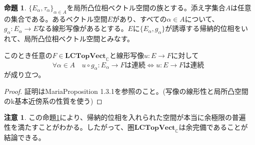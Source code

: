 ﻿\documentclass[12pt]{jsarticle}
\newcommand{\C}{\mathbb{C}}
\newcommand{\LCTopVect}{\textbf{LCTopVect}_{\C}}
\theoremstyle{definition}%
\newtheorem{proposition}[definition]{命題}
\newtheorem{remark}[definition]{注意}
\begin{document}
\begin{proposition}\label{universality}
  $\{ E_{\alpha} , \tau_{\alpha} \}_{\alpha \in A}$を局所凸位相ベクトル空間の族とする。添え字集合$A$は任意の集合である。あるベクトル空間$E$があり、すべての$\alpha \in A$について、$g_{\alpha} \colon E_{\alpha} \to E$なる線形写像があるとする。$E$に$\{ E_{\alpha}, g_{\alpha}\}$が誘導する帰納的位相をいれて、局所凸位相ベクトル空間とみなす。

  このとき任意の$F \in \LCTopVect$と線形写像$u \colon E \to F$に対して
  \[
\forall \alpha \in A \quad u \circ g_{\alpha} \colon E_{\alpha} \to F \text{は連続} \Leftrightarrow u \colon E \to F \text{は連続}
  \]
  が成り立つ。
\end{proposition}

\begin{proof}
  証明はMaria\cite{Maria-II}Proposition 1.3.1を参照のこと。(写像の線形性と局所凸空間のk基本近傍系の性質を使う)
\end{proof}


\begin{remark}
この命題\ref{universality}により、帰納的位相を入れられた空間が本当に余極限の普遍性を満たすことがわかる。したがって、圏$\LCTopVect$は余完備であることが結論できる。
\end{remark}
\end{document}
